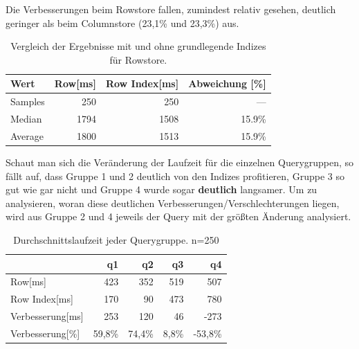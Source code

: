 Die Verbesserungen beim Rowstore fallen, zumindest relativ gesehen, deutlich geringer als beim Columnstore (23,1\% und 23,3\%) aus.

\begin{table}[H]
    \begin{tabularx}{\textwidth}{lrrr}
        \toprule
        Wert                & Row[ms] & Row Index[ms]   & Abweichung [\%]\\
        \toprule
        Samples             & 250      & 250            &   ---    \\
        \midrule
        Median              & 1794     & 1508           &  15.9\%     \\
        Average             & 1800     & 1513           &  15.9\%     \\
        \bottomrule
    \end{tabularx}
\caption{Vergleich der Ergebnisse mit und ohne grundlegende Indizes für Rowstore.}
\label{tab:basic_index_row}
\end{table}

Schaut man sich die Veränderung der Laufzeit für die einzelnen Querygruppen, so fällt auf, dass Gruppe 1 und 2 deutlich von den Indizes profitieren, Gruppe 3 so gut wie gar nicht und Gruppe 4 wurde sogar \textbf{deutlich} langsamer.
Um zu analysieren, woran diese deutlichen Verbesserungen/Verschlechterungen liegen, wird aus Gruppe 2 und 4 jeweils der Query mit der größten Änderung analysiert.

\begin{table}[H]
    \begin{tabularx}{\linewidth}{lrrrr}
        \toprule
                            &   q1          &   q2      &	q3      & q4          \\
        \toprule
        Row[ms]	            &	423	        &	352	    &	519	    & 507	      \\
        Row Index[ms]       &   170         &   90	    &   473	    & 780	      \\
        Verbesserung[ms]    &   253         &   120     &   46      & -273        \\
        Verbesserung[\%]    &   59,8\%      &   74,4\%  &   8,8\%   & -53,8\%     \\    
\bottomrule
\end{tabularx}
\caption{Durchschnittslaufzeit jeder Querygruppe. n=250}
\label{tab:basic_index_row}
\end{table}



